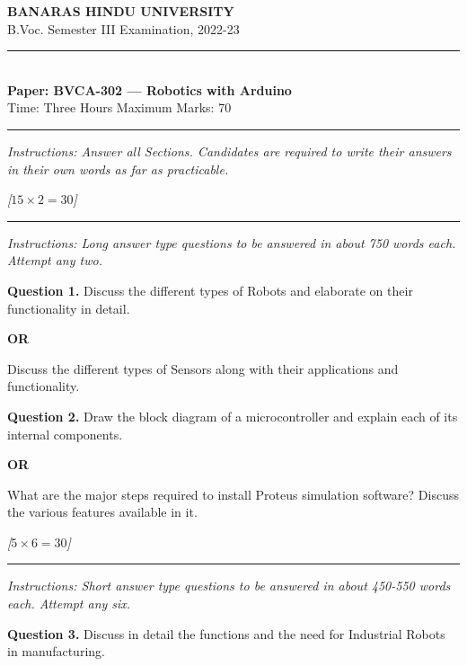 \documentclass[11pt,a4paper]{article}
\newcommand{\pts}[1]{\hfill   \textit{[#1]}}
\begin{document}
\begin{center}
  {\large\bfseries BANARAS HINDU UNIVERSITY}\\[2pt]
  {\normalsize B.Voc. Semester III Examination, 2022-23}\\[6pt]
  \rule{0.8\linewidth}{0.5pt}\\[6pt]
  {\large\bfseries Paper: BVCA-302 --- Robotics with Arduino}\\[4pt]
  {\normalsize Time: Three Hours \hfill Maximum Marks: 70}
\end{center}

\rule{\linewidth}{0.4pt}

\smallskip



\noindent   \textit{Instructions: Answer all Sections. Candidates are required to write their answers in their own words as far as practicable.}

\bigskip

\bigskip


\pts{$15  \times 2 = 30$}
\rule{\linewidth}{0.4pt}\smallskip




\noindent   \textit{Instructions: Long answer type questions to be answered in about 750 words each. Attempt any two.}

\medskip


\noindent   \textbf{Question 1.} Discuss the different types of Robots and elaborate on their functionality in detail.
\centerline{   \textbf{OR}}
Discuss the different types of Sensors along with their applications and functionality.

\medskip


\noindent   \textbf{Question 2.} Draw the block diagram of a microcontroller and explain each of its internal components.
\centerline{   \textbf{OR}}
What are the major steps required to install Proteus simulation software? Discuss the various features available in it.

\bigskip


\pts{$5  \times 6 = 30$}
\rule{\linewidth}{0.4pt}\smallskip




\noindent   \textit{Instructions: Short answer type questions to be answered in about 450-550 words each. Attempt any six.}

\medskip


\noindent   \textbf{Question 3.} Discuss in detail the functions and the need for Industrial Robots in manufacturing.
\end{document}
